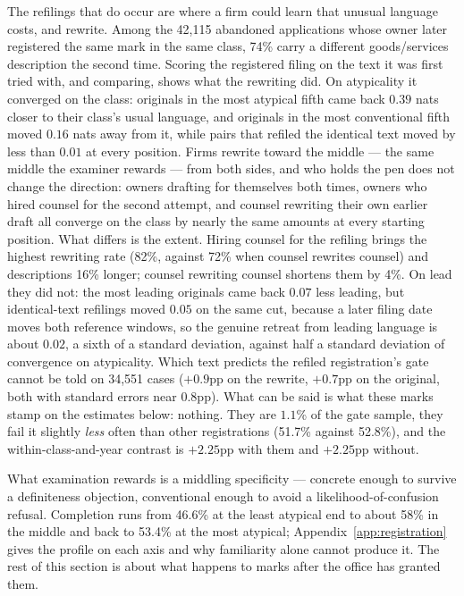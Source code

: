 \documentclass[11pt]{article}
\begin{document}
The refilings that do occur are where a firm could learn that unusual
language costs, and rewrite. Among the 42{,}115 abandoned applications whose
owner later registered the same mark in the same class, 74\% carry a
different goods/services description the second time. Scoring the
registered filing on the text it was first tried with, and comparing, shows
what the rewriting did. On atypicality it converged on the class: originals
in the most atypical fifth came back $0.39$ nats closer to their class's
usual language, and originals in the most conventional fifth moved $0.16$
nats away from it, while pairs that refiled the identical text moved by less
than $0.01$ at every position. Firms rewrite toward the middle --- the same
middle the examiner rewards --- from both sides, and who holds the pen does
not change the direction: owners drafting for themselves both times, owners
who hired counsel for the second attempt, and counsel rewriting their own
earlier draft all converge on the class by nearly the same amounts at every
starting position. What differs is the extent. Hiring counsel for the
refiling brings the highest rewriting rate (82\%, against 72\% when counsel
rewrites counsel) and descriptions 16\% longer; counsel rewriting counsel
shortens them by 4\%. On lead they did not: the
most leading originals came back $0.07$ less leading, but identical-text
refilings moved $0.05$ on the same cut, because a later filing date moves
both reference windows, so the genuine retreat from leading language is
about $0.02$, a sixth of a standard deviation, against half a standard
deviation of convergence on atypicality. Which text predicts the refiled
registration's gate cannot be told on 34{,}551 cases ($+0.9$pp on the
rewrite, $+0.7$pp on the original, both with standard errors near $0.8$pp).
What can be said is what these marks stamp on the estimates below: nothing.
They are $1.1$\% of the gate sample, they fail it slightly \emph{less} often
than other registrations (51.7\% against 52.8\%), and the within-class-and-year
contrast is $+2.25$pp with them and $+2.25$pp without.

What examination rewards is a middling specificity --- concrete enough to
survive a definiteness objection, conventional enough to avoid a
likelihood-of-confusion refusal. Completion runs from 46.6\% at the least
atypical end to about 58\% in the middle and back to 53.4\% at the most
atypical; Appendix~\ref{app:registration} gives the profile on each axis and
why familiarity alone cannot produce it. The rest of this section is about what
happens to marks after the office has granted them.
\end{document}
